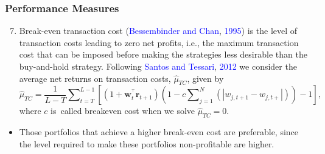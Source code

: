 \documentclass[pdf,9pt,xcolor=dvipsnames,hide notes]{beamer}
\begin{document}
\begin{frame}
	\frametitle{Performance Measures}
	
	\begin{enumerate}
		\setcounter{enumi}{6}
		
		\item Break-even transaction cost (\textcolor{blue}{Bessembinder and Chan}, \textcolor{blue}{1995}) is the level of transaction costs leading to zero
		net profits, i.e., the maximum transaction cost that can be imposed before
		making the strategies less desirable than the buy-and-hold strategy. Following \textcolor{blue}{Santos and Tessari}, \textcolor{blue}{2012} we consider the average net
		returns on transaction costs, $\widehat{\mu }_{TC}$, given by
		\begin{equation}
		\widehat{\mu }_{TC}=\frac{1}{L-T}\sum\nolimits_{t=T}^{L-1}\left[ \left( 1+%
		\mathbf{w}_{t}^{^{\top }}\mathbf{r}_{t+1}\right) \left(
		1-c\sum\nolimits_{j=1}^{N}\left( \left\vert w_{j,t+1}-w_{j,t+}\right\vert
		\right) \right) -1\right] ,
		\end{equation}%
		where $c$ is\ called breakeven cost when we solve $\widehat{\mu }_{TC}=0.$
		
		
	\end{enumerate}

\vspace{0.3cm}

\begin{itemize}
	\item 	Those portfolios that achieve a
	higher break-even cost are preferable, since the level required to make
	these portfolios non-profitable are higher.
\end{itemize}
	
	
\end{frame}
\end{document}
